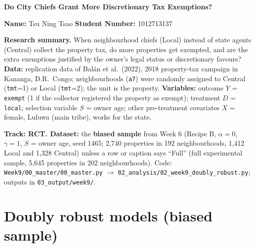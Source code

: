 \documentclass[11pt]{article}
\begin{document}
\begin{center}
{\Large\bfseries Do City Chiefs Grant More Discretionary Tax Exemptions?}

\vspace{4pt}
\textbf{Name:} Tsu Ning Tsao \quad \textbf{Student Number:} 1012713137
\end{center}

\textbf{Research summary.} When neighbourhood chiefs (Local) instead of state agents (Central) collect the property tax, do more properties get exempted, and are the extra exemptions justified by the owner's legal status or discretionary favours? \textbf{Data:} replication data of Bal\'an et al.\ (2022), 2018 property-tax campaign in Kananga, D.R.\ Congo; neighbourhoods (\texttt{a7}) were randomly assigned to Central (\texttt{tmt}=1) or Local (\texttt{tmt}=2); the unit is the property. \textbf{Variables:} outcome $Y$ = \texttt{exempt} (1 if the collector registered the property as exempt); treatment $D$ = \texttt{local}; selection variable $S$ = owner age; other pre-treatment covariates $X$ = female, Luluwa (main tribe), works for the state.

\textbf{Track: RCT. Dataset:} the \textbf{biased sample} from Week 6 (Recipe B, $\alpha=0$, $\gamma=1$, $S$ = owner age, seed 1465; 2,740 properties in 192 neighbourhoods, 1,412 Local and 1,328 Central) unless a row or caption says ``Full'' (full experimental sample, 5,645 properties in 202 neighbourhoods). Code: \texttt{Week9/00\_master/00\_master.py} $\rightarrow$ \texttt{02\_analysis/02\_week9\_doubly\_robust.py}; outputs in \texttt{03\_output/week9/}.

\section{Doubly robust models (biased sample)}
\end{document}
